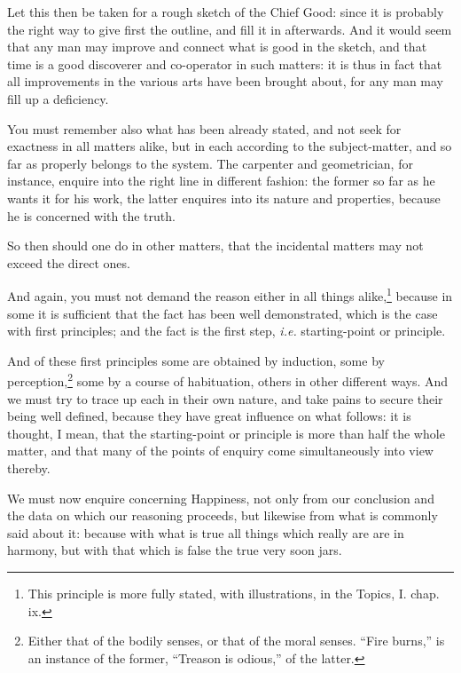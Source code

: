 Let this then be taken for a rough sketch of the Chief Good: since it is
probably the right way to give first the outline, and fill it in afterwards.
And it would seem that any man may improve and connect what is good in the
sketch, and that time is a good discoverer and co-operator in such matters: it
is thus in fact that all improvements in the various arts have been brought
about, for any man may fill up a deficiency.

You must remember also what has been already stated, and not seek for exactness
in all matters alike, but in each according to the subject-matter, and so far
as properly belongs to the system. The carpenter and geometrician, for
instance, enquire into the right line in different fashion: the former so far
as he wants it for his work, the latter enquires into its nature and
properties, because he is concerned with the truth.

So then should one do in other matters, that the incidental matters may not
exceed the direct ones.

And again, you must not demand the reason either in all things alike,\footnote{This principle is more fully stated, with illustrations, in the Topics, I.
chap. ix.}
because in some it is sufficient that the fact has been well demonstrated,
which is the case with first principles; and the fact is the first step,
\emph{i.e.} starting-point or principle.

And of these first principles some are obtained by induction, some by
perception,\footnote{Either that of the bodily senses, or that of the moral senses. “Fire
burns,” is an instance of the former, “Treason is odious,” of
the latter.}
some by a course of habituation, others in other different ways. And we must
try to trace up each in their own nature, and take pains to secure their being
well defined, because they have great influence on what follows: it is thought,
I mean, that the starting-point or principle is more than half the whole
matter, and that many of the points of enquiry come simultaneously into view
thereby.


We must now enquire concerning Happiness, not only from our conclusion and the
data on which our reasoning proceeds, but likewise from what is commonly said
about it: because with what is true all things which really are are in harmony,
but with that which is false the true very soon jars.

